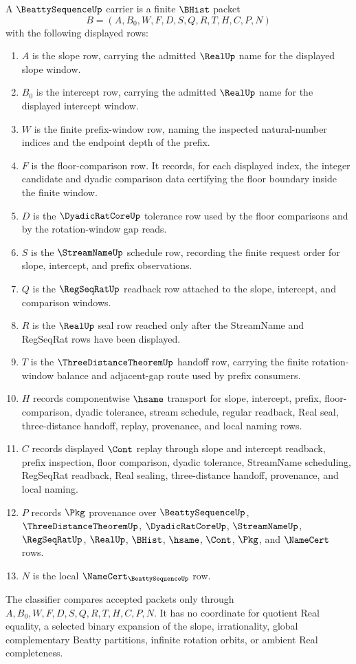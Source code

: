 \begin{definition}
\label{def:beatty-sequence-carrier}
A $\BeattySequenceUp$ carrier is a finite $\BHist$ packet
$$
B=(A,B_0,W,F,D,S,Q,R,T,H,C,P,N)
$$
with the following displayed rows:
\begin{enumerate}
\item $A$ is the slope row, carrying the admitted $\RealUp$ name for the displayed slope window.
\item $B_0$ is the intercept row, carrying the admitted $\RealUp$ name for the displayed intercept window.
\item $W$ is the finite prefix-window row, naming the inspected natural-number indices and the endpoint depth of the prefix.
\item $F$ is the floor-comparison row. It records, for each displayed index, the integer candidate and dyadic comparison data certifying the floor boundary inside the finite window.
\item $D$ is the $\DyadicRatCoreUp$ tolerance row used by the floor comparisons and by the rotation-window gap reads.
\item $S$ is the $\StreamNameUp$ schedule row, recording the finite request order for slope, intercept, and prefix observations.
\item $Q$ is the $\RegSeqRatUp$ readback row attached to the slope, intercept, and comparison windows.
\item $R$ is the $\RealUp$ seal row reached only after the StreamName and RegSeqRat rows have been displayed.
\item $T$ is the $\ThreeDistanceTheoremUp$ handoff row, carrying the finite rotation-window balance and adjacent-gap route used by prefix consumers.
\item $H$ records componentwise $\hsame$ transport for slope, intercept, prefix, floor-comparison, dyadic tolerance, stream schedule, regular readback, Real seal, three-distance handoff, replay, provenance, and local naming rows.
\item $C$ records displayed $\Cont$ replay through slope and intercept readback, prefix inspection, floor comparison, dyadic tolerance, StreamName scheduling, RegSeqRat readback, Real sealing, three-distance handoff, provenance, and local naming.
\item $P$ records $\Pkg$ provenance over $\BeattySequenceUp$, $\ThreeDistanceTheoremUp$, $\DyadicRatCoreUp$, $\StreamNameUp$, $\RegSeqRatUp$, $\RealUp$, $\BHist$, $\hsame$, $\Cont$, $\Pkg$, and $\NameCert$ rows.
\item $N$ is the local $\NameCert_{\BeattySequenceUp}$ row.
\end{enumerate}
The classifier compares accepted packets only through $A,B_0,W,F,D,S,Q,R,T,H,C,P,N$. It has no coordinate for quotient Real equality, a selected binary expansion of the slope, irrationality, global complementary Beatty partitions, infinite rotation orbits, or ambient Real completeness.
\end{definition}

